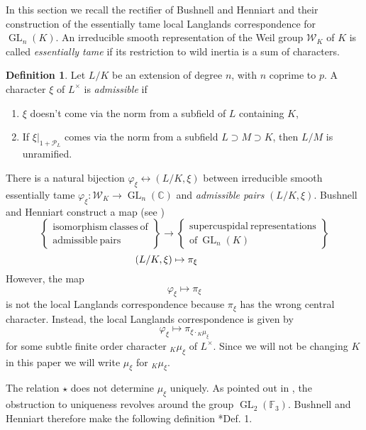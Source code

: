 \documentclass{amsart}
\theoremstyle{plain}
\theoremstyle{definition}
\newtheorem{definition}[theorem]{Definition}
\numberwithin{equation}{section}
\DeclareMathOperator{\GL}{GL}
\newcommand{\PL}{\mathcal{P}_L}
\newcommand{\Lx}{L^\times}
\newcommand{\Weil}{\mathcal{W}}
\begin{document}
In this section we recall the rectifier of Bushnell and Henniart and their construction of the
essentially tame local Langlands correspondence for $\GL_{n}(K)$.
An irreducible smooth representation of the Weil group $\Weil_K$ of $K$ is
called \emph{essentially tame} if its restriction to wild inertia is a
sum of characters.
\begin{definition}\label{admissiblepairhowe}
Let $L/K$ be an extension of degree $n$, with $n$ coprime to $p$.  A character
$\xi$ of $L^\times$ is \emph{admissible} if
\begin{enumerate}
\item $\xi$ doesn't come via the norm from a subfield of $L$ containing $K$,
\item If $\xi|_{1 + \PL}$ comes via the norm from a subfield $L \supset M \supset K$, then
$L/M$ is unramified.
\end{enumerate}
\end{definition}
There is a natural bijection
$\varphi_{\xi} \leftrightarrow (L/K, \xi)$ between irreducible smooth essentially tame
$\varphi_{\xi} : \Weil_K \rightarrow \GL_{n}(\mathbb{C})$ and
\emph{admissible pairs} $(L/K, \xi)$.
Bushnell and Henniart
construct a map (see \cite{bushnell-henniart:10a})
\begin{equation*}
\left\{
\begin{array}{cc}
\mathrm{isomorphism \ classes \ of} \\
\mathrm{admissible \ pairs}
\end{array}
\right\} \rightarrow \left\{
\begin{array}{cc}
\mathrm{supercuspidal \ representations} \\
\mathrm{of} \ \GL_{n}(K)
\end{array} \right\}
\end{equation*}
$$\hspace{-.5in} (L/K, \xi) \mapsto \pi_{\xi}$$
However, the map $$\varphi_{\xi} \mapsto \pi_{\xi}$$
is not the local Langlands
correspondence because $\pi_{\xi}$ has the wrong central character.
Instead, the local Langlands correspondence is given by
\begin{equation}\label{llcgln}
\varphi_{\xi} \mapsto \pi_{\xi \cdot {}_K \mu_{\xi}} \tag{$\star$}
\end{equation}
for some subtle finite order
character ${}_K \mu_{\xi}$ of $\Lx$.  Since we will not be changing $K$
in this paper we will write $\mu_\xi$ for ${}_K \mu_{\xi}$.

The relation $\star$ does not determine $\mu_{\xi}$ uniquely.  As pointed out
in \cite{bushnell-henniart:10a}, the obstruction to uniqueness revolves around the
group $\GL_2(\mathbb{F}_3)$.  Bushnell and Henniart therefore make the following definition \cite{bushnell-henniart:10a}*{Def. 1}.
\end{document}
